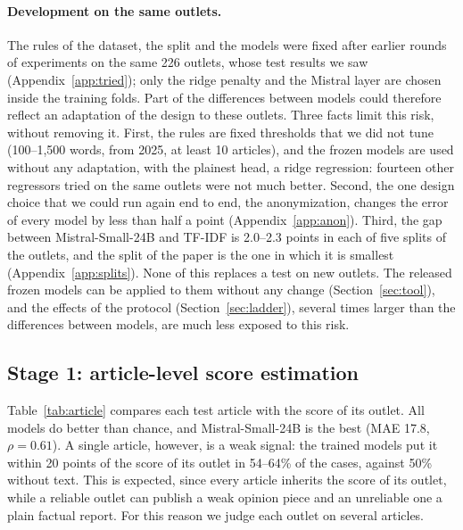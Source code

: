 \documentclass[11pt,a4paper]{article}
\begin{document}
\paragraph{Development on the same outlets.} The rules of the dataset, the split and the models were fixed after earlier
rounds of experiments on the same 226 outlets, whose test results we saw (Appendix~\ref{app:tried}); only the ridge
penalty and the Mistral layer are chosen inside the training folds. Part of the differences between models could
therefore reflect an adaptation of the design to these outlets. Three facts limit this risk, without removing it. First,
the rules are fixed thresholds that we did not tune (100--1,500 words, from 2025, at least 10 articles), and the frozen
models are used without any adaptation, with the plainest head, a ridge regression: fourteen other regressors tried on
the same outlets were not much better. Second, the one design choice that we could run again end to end, the
anonymization, changes the error of every model by less than half a point (Appendix~\ref{app:anon}). Third, the gap
between Mistral-Small-24B and TF-IDF is 2.0--2.3 points in each of five splits of the outlets, and the split of the paper
is the one in which it is smallest (Appendix~\ref{app:splits}). None of this replaces a test on new outlets. The
released frozen models can be applied to them without any change (Section~\ref{sec:tool}), and the effects of the protocol (Section~\ref{sec:ladder}), several times larger than the differences between models,
are much less exposed to this risk.

\subsection{Stage 1: article-level score estimation}\label{sec:stage1}
Table~\ref{tab:article} compares each test article with the score of its outlet. All models do better than chance, and
Mistral-Small-24B is the best (MAE 17.8, $\rho = 0.61$). A single article, however, is a weak signal: the trained models
put it within 20 points of the score of its outlet in 54--64\% of the cases, against 50\% without text. This is
expected, since every article inherits the score of its outlet, while a reliable outlet can publish a weak opinion piece
and an unreliable one a plain factual report. For this reason we judge each outlet on several articles.
\end{document}
